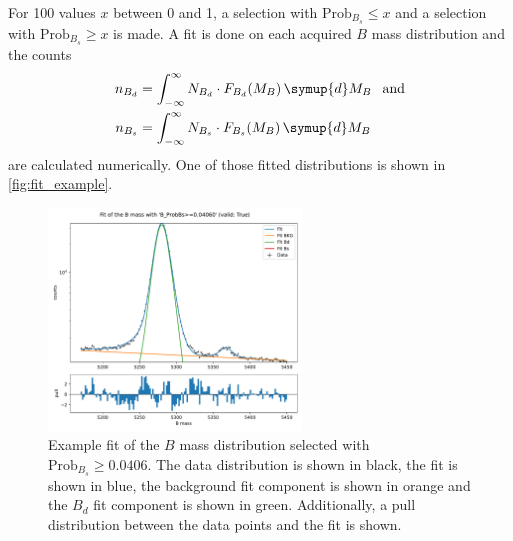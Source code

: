 For 100 values $x$ between 0 and 1, a selection with $\text{Prob}_{B_s} \leq x$ and a selection with $\text{Prob}_{B_s} \geq x$ is made.
A fit is done on each acquired $B$ mass distribution and the counts
\begin{align*}
    n_{B_d} &= \int_{-\infty}^{\infty} N_{B_d} \cdot F_{B_d}(M_B) \, \symup{d}M_B \:\:\text{ and} \\
    n_{B_s} &= \int_{-\infty}^{\infty} N_{B_s} \cdot F_{B_s}(M_B) \, \symup{d}M_B
\end{align*}
are calculated numerically.
One of those fitted distributions is shown in \autoref{fig:fit_example}.

\begin{figure}
    \centering
    \includegraphics[width=0.6\textwidth]{images/fit_example.pdf}
    \caption{Example fit of the $B$ mass distribution selected with $\text{Prob}_{B_s} \geq 0.0406$. The data distribution is shown in black, the fit is shown in blue, the background fit component is shown in orange and the $B_d$ fit component is shown in green. Additionally, a pull distribution between the data points and the fit is shown.}
    \label{fig:fit_example}
\end{figure}

